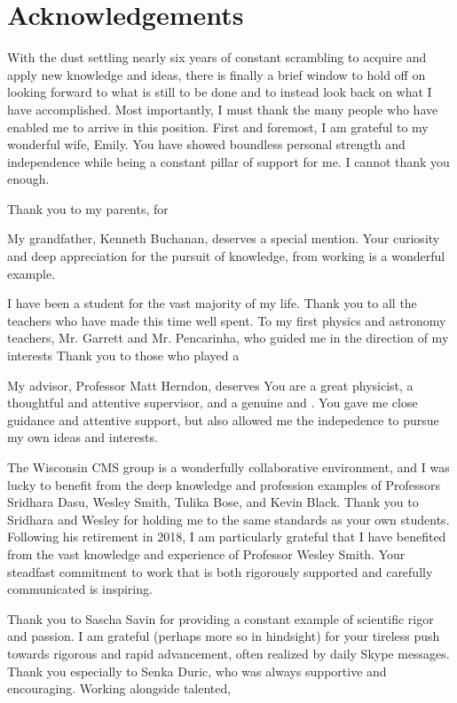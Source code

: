 \section{Acknowledgements}

With the dust settling nearly six years 
of constant scrambling to acquire and apply new knowledge and ideas,
there is finally a brief window to hold off on looking forward
to what is still to be done and to instead look back on what I have 
accomplished. Most importantly, I must thank the many people who have
enabled me to arrive in this position. First and foremost, I am grateful
to my wonderful wife, Emily. You have showed boundless
personal strength and independence while being a constant pillar of 
support for me. I cannot thank you enough.

Thank you to my parents, for 

My grandfather, Kenneth Buchanan, deserves a special mention. Your curiosity
and deep appreciation for the pursuit of knowledge,
from working is a wonderful example.


I have been a student for the vast majority of my life. Thank you to all the
teachers who have made this time well spent. To my first physics and astronomy teachers,
Mr. Garrett and Mr. Pencarinha, who guided me in the direction of my interests
Thank you to those who played a 

My advisor, Professor Matt Herndon, deserves 
You are a great physicist, a thoughtful and attentive supervisor,
and a genuine and . You gave me close guidance and attentive support, but
also allowed me the indepedence to pursue my own ideas and interests.

The Wisconsin CMS group is a wonderfully collaborative environment,
and I was lucky to benefit from the deep knowledge and profession examples
of Professors Sridhara Dasu, Wesley Smith, Tulika Bose, and Kevin Black. 
Thank you to Sridhara and Wesley for holding me to the same standards 
as your own students. Following his retirement in 2018, 
I am particularly grateful that I have benefited 
from the vast knowledge and experience of Professor Wesley Smith.
Your steadfast commitment to work that is both rigorously
supported and carefully communicated is inspiring.

Thank you to Sascha Savin for providing a constant example of scientific
rigor and passion.  
I am grateful (perhaps more so in hindsight) for your tireless push
towards rigorous and rapid advancement, often realized by daily Skype
messages.
Thank you especially to Senka Duric, who was always supportive and
encouraging. Working alongside talented, 

